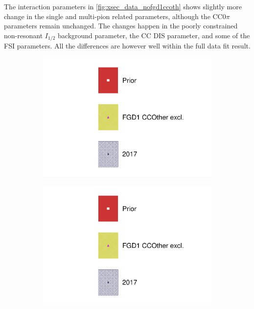 The interaction parameters in \autoref{fig:xsec_data_nofgd1ccoth} shows slightly more change in the single and multi-pion related parameters, although the CC0$\pi$ parameters remain unchanged. The changes happen in the poorly constrained non-resonant $I_{1/2}$ background parameter, the CC DIS parameter, and some of the FSI parameters. All the differences are however well within the full data fit result.
\begin{figure}[h]
	\begin{subfigure}[t]{0.49\textwidth}
		\includegraphics[width=\textwidth, trim={0mm 0mm 0mm 0mm}, clip,page=18]{figures/mach3/data/alt/2017b_NoFGD1CCOth_Data_merg_2017b_NewData_NewDet_UpdXsecStep_2Xsec_4Det_5Flux_0}
	\end{subfigure}
	\begin{subfigure}[t]{0.49\textwidth}
		\includegraphics[width=\textwidth, trim={0mm 0mm 0mm 0mm}, clip,page=19]{figures/mach3/data/alt/2017b_NoFGD1CCOth_Data_merg_2017b_NewData_NewDet_UpdXsecStep_2Xsec_4Det_5Flux_0}
	\end{subfigure}
	

\end{figure}
